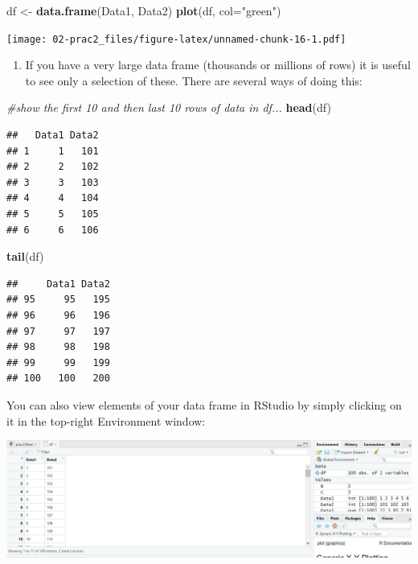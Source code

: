 \documentclass[]{book}
\newenvironment{Shaded}{\begin{snugshade}}{\end{snugshade}}
\newcommand{\CommentTok}[1]{\textcolor[rgb]{0.56,0.35,0.01}{\textit{#1}}}
\newcommand{\DataTypeTok}[1]{\textcolor[rgb]{0.13,0.29,0.53}{#1}}
\newcommand{\KeywordTok}[1]{\textcolor[rgb]{0.13,0.29,0.53}{\textbf{#1}}}
\newcommand{\NormalTok}[1]{#1}
\newcommand{\StringTok}[1]{\textcolor[rgb]{0.31,0.60,0.02}{#1}}
\providecommand{\tightlist}{%
  \setlength{\itemsep}{0pt}\setlength{\parskip}{0pt}}
\begin{document}
\begin{Shaded}
\begin{Highlighting}[]
\NormalTok{df <-}\StringTok{ }\KeywordTok{data.frame}\NormalTok{(Data1, Data2)}
\KeywordTok{plot}\NormalTok{(df, }\DataTypeTok{col=}\StringTok{"green"}\NormalTok{)}
\end{Highlighting}
\end{Shaded}

\texttt{[image: 02-prac2\_files/figure-latex/unnamed-chunk-16-1.pdf]}

\begin{enumerate}
\def\labelenumi{\arabic{enumi}.}
\setcounter{enumi}{17}
\tightlist
\item
  If you have a very large data frame (thousands or millions of rows) it is useful to see only a selection of these. There are several ways of doing this:
\end{enumerate}

\begin{Shaded}
\begin{Highlighting}[]
\CommentTok{#show the first 10 and then last 10 rows of data in df...}
\KeywordTok{head}\NormalTok{(df)}
\end{Highlighting}
\end{Shaded}

\begin{verbatim}
##   Data1 Data2
## 1     1   101
## 2     2   102
## 3     3   103
## 4     4   104
## 5     5   105
## 6     6   106
\end{verbatim}

\begin{Shaded}
\begin{Highlighting}[]
\KeywordTok{tail}\NormalTok{(df)}
\end{Highlighting}
\end{Shaded}

\begin{verbatim}
##     Data1 Data2
## 95     95   195
## 96     96   196
## 97     97   197
## 98     98   198
## 99     99   199
## 100   100   200
\end{verbatim}

You can also view elements of your data frame in RStudio by simply clicking on it in the top-right Environment window:

\begin{center}\includegraphics[width=800px]{prac2_images/dataview} \end{center}
\end{document}
